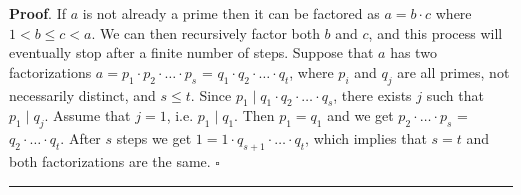 \documentclass[10pt,varwidth=6in,margin=0.2in,preview]{standalone}
\begin{document}
\begin{flushleft}
\textbf{Proof}.
If $a$ is not already a prime then it can be factored as $a = b \cdot c$ where $1 < b \le c < a$. 
We can then recursively factor both $b$ and $c$, and this process will eventually stop after a finite number of steps.
Suppose that $a$ has two factorizations $a = p_1 \cdot p_2 \cdot \ldots \cdot p_s$ = $q_1 \cdot q_2 \cdot \ldots \cdot q_t$, where $p_i$ and $q_j$ are all primes, not necessarily distinct, and $s \le t$.
Since $p_1 \mid q_1 \cdot q_2 \cdot \ldots \cdot q_s$, there exists $j$ such that $p_1 \mid q_j$.
Assume that $j = 1$, i.e. $p_1 \mid q_1$.
Then $p_1 = q_1$ and we get $p_2 \cdot \ldots \cdot p_s$ = $q_2 \cdot \ldots \cdot q_t$.
After $s$ steps we get $1 = 1 \cdot q_{s+1} \cdot \ldots \cdot q_t$, which implies that $s = t$ and both factorizations are the same. $\square$



\vspace{4in}

\hrule

\end{flushleft}
\end{document}
